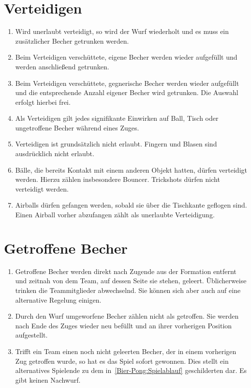 
\section{Verteidigen}\label{Bier-Pong:Verteidigen}
\begin{enumerate}[label={(\arabic*)}]
    \item
    Wird unerlaubt verteidigt, so wird der Wurf wiederholt und es muss ein zusätzlicher Becher getrunken werden.

    \item
    Beim Verteidigen verschüttete, eigene Becher werden wieder aufgefüllt und werden anschließend getrunken.

    \item
    Beim Verteidigen verschüttete, gegnerische Becher werden wieder aufgefüllt und die entsprechende Anzahl eigener Becher wird getrunken.
    Die Auswahl erfolgt hierbei frei.

    \item
    Als Verteidigen gilt jedes signifikante Einwirken auf Ball, Tisch oder ungetroffene Becher während eines Zuges.

    \item
    Verteidigen ist grundsätzlich nicht erlaubt.
    Fingern und Blasen sind ausdrücklich nicht erlaubt.

    \item
    Bälle, die bereits Kontakt mit einem anderen Objekt hatten, dürfen verteidigt werden.
    Hierzu zählen insbesondere Bouncer.
    Trickshots dürfen nicht verteidigt werden.

    \item
    Airballs dürfen gefangen werden, sobald sie über die Tischkante geflogen sind.
    Einen Airball vorher abzufangen zählt als unerlaubte Verteidigung.
\end{enumerate}

\section{Getroffene Becher}
\begin{enumerate}[label={(\arabic*)}]
    \item
    Getroffene Becher werden direkt nach Zugende aus der Formation entfernt und zeitnah von dem Team, auf dessen Seite sie stehen, geleert.
    Üblicherweise trinken die Teammitglieder abwechselnd.
    Sie können sich aber auch auf eine alternative Regelung einigen.

    \item
    Durch den Wurf umgeworfene Becher zählen nicht als getroffen.
    Sie werden nach Ende des Zuges wieder neu befüllt und an ihrer vorherigen Position aufgestellt.

    \item
    Trifft ein Team einen noch nicht geleerten Becher, der in einem vorherigen Zug getroffen wurde, so hat es das Spiel sofort gewonnen.
    Dies stellt ein alternatives Spielende zu dem in~\ref{Bier-Pong:Spielablauf} geschilderten dar.
    Es gibt keinen Nachwurf.
\end{enumerate}


